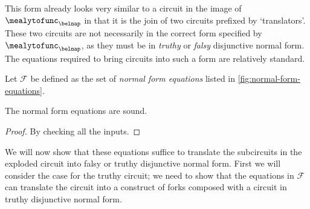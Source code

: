 This form already looks very similar to a circuit in the image of
\(\mealytofunc_\belnap\) in that it is the join of two circuits prefixed by
`translators'.
These two circuits are not necessarily in the correct form specified by
\(\mealytofunc_\belnap\), as they must be in \emph{truthy} or \emph{falsy}
disjunctive normal form.
The equations required to bring circuits into such a form are
relatively standard.

\begin{definition}
    Let \(\mathcal{F}\) be defined as the set of \emph{normal form equations}
    listed in \cref{fig:normal-form-equations}.
\end{definition}

\begin{lemma}
    The normal form equations are sound.
\end{lemma}
\begin{proof}
    By checking all the inputs.
\end{proof}



We will now show that these equations suffice to translate the subcircuits in
the exploded circuit into falsy or truthy disjunctive normal form.
First we will consider the case for the truthy circuit; we need to show that
the equations in \(\mathcal{F}\) can translate the circuit into a construct of
forks composed with a circuit in truthy disjunctive normal form.

